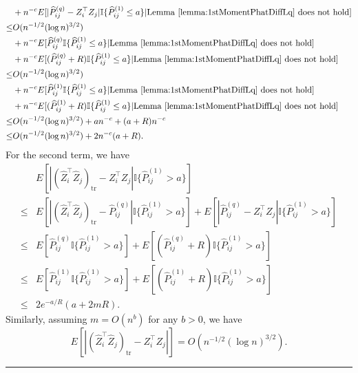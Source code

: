 \documentclass[a4paper]{article}
\newenvironment{proof}{{\bf Proof:  }}{\hfill\rule{2mm}{2mm}}
\renewcommand{\hat}{\widehat}
\begin{document}
\begin{proof}
\begin{align*}
	& + n^{-c} E[|\hat{P}^{(q)}_{ij} - Z_i^{\top} Z_j| \mathbb{I}\{\hat{P}^{(1)}_{ij} \le a\} | \mathrm{Lemma\ } \ref{lemma:1stMomentPhatDiffLq} \mathrm{\ does\ not\ hold}] \\
	\le & O(n^{-1/2} (\log n)^{3/2}) \\
	& + n^{-c} E[\hat{P}^{(q)}_{ij} \mathbb{I}\{\hat{P}^{(1)}_{ij} \le a\} | \mathrm{Lemma\ } \ref{lemma:1stMomentPhatDiffLq} \mathrm{\ does\ not\ hold}] \\
	& + n^{-c} E[(\hat{P}^{(q)}_{ij} + R) \mathbb{I}\{\hat{P}^{(1)}_{ij} \le a\} | \mathrm{Lemma\ } \ref{lemma:1stMomentPhatDiffLq} \mathrm{\ does\ not\ hold}] \\
	\le & O(n^{-1/2} (\log n)^{3/2}) \\
	& + n^{-c} E[\hat{P}^{(1)}_{ij} \mathbb{I}\{\hat{P}^{(1)}_{ij} \le a\} | \mathrm{Lemma\ } \ref{lemma:1stMomentPhatDiffLq} \mathrm{\ does\ not\ hold}] \\
	& + n^{-c} E[(\hat{P}^{(1)}_{ij} + R) \mathbb{I}\{\hat{P}^{(1)}_{ij} \le a\} | \mathrm{Lemma\ } \ref{lemma:1stMomentPhatDiffLq} \mathrm{\ does\ not\ hold}] \\
	\le & O(n^{-1/2} (\log n)^{3/2}) + a n^{-c} + (a+R) n^{-c} \\
	\le & O(n^{-1/2} (\log n)^{3/2}) + 2 n^{-c} (a + R).
\end{align*}
For the second term, we have
\begin{align*}
	& E[|(\hat{Z}_i^{\top} \hat{Z}_j)_{\mathrm{tr}} - Z_i^{\top} Z_j| \mathbb{I}\{\hat{P}^{(1)}_{ij} > a\}] \\
	\le & E[|(\hat{Z}_i^{\top} \hat{Z}_j)_{\mathrm{tr}} - \hat{P}^{(q)}_{ij}| \mathbb{I}\{\hat{P}^{(1)}_{ij} > a\}] + E[|\hat{P}^{(q)}_{ij} - Z_i^{\top} Z_j| \mathbb{I}\{\hat{P}^{(1)}_{ij} > a\}] \\
	\le & E[\hat{P}^{(q)}_{ij} \mathbb{I}\{\hat{P}^{(1)}_{ij} > a\}] + E[(\hat{P}^{(q)}_{ij} + R) \mathbb{I}\{\hat{P}^{(1)}_{ij} > a\}] \\
	\le & E[\hat{P}^{(1)}_{ij} \mathbb{I}\{\hat{P}^{(1)}_{ij} > a\}] + E[(\hat{P}^{(1)}_{ij} + R) \mathbb{I}\{\hat{P}^{(1)}_{ij} > a\}] \\
	\le & 2 e^{-a/R} (a + 2 m R).
\end{align*}
Similarly, assuming $m = O(n^b)$ for any $b > 0$, we have
\[
E[|(\hat{Z}_i^{\top} \hat{Z}_j)_{\mathrm{tr}} - Z_i^{\top} Z_j|] = O(n^{-1/2} (\log n)^{3/2}).
\]
\end{proof}
\end{document}
